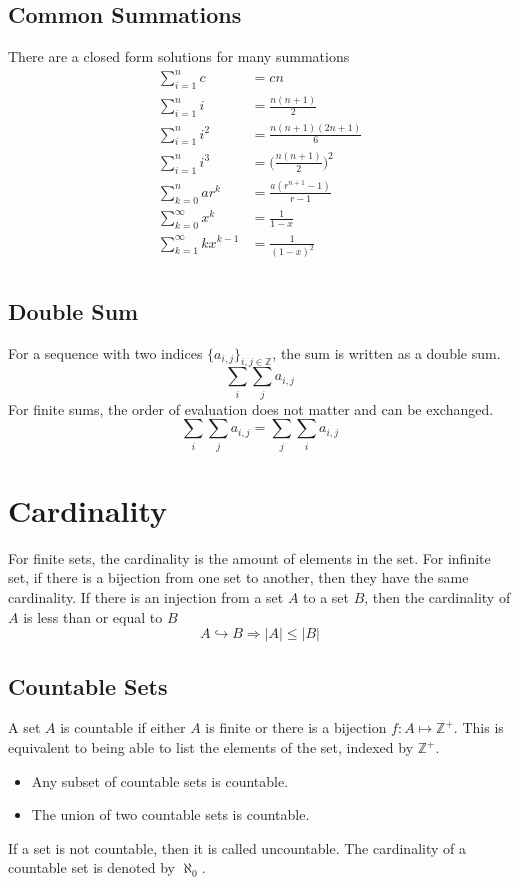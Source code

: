 \documentclass{article}
\theoremstyle{mytheoremstyle}
\theoremstyle{mytheoremstyle}
\theoremstyle{myproblemstyle}
\begin{document}
    \subsection*{Common Summations}
    There are a closed form solutions for many summations
    \begin{align*}
        \sum_{i=1}^{n} c &= cn \\
        \sum_{i=1}^{n} i &= \frac{n(n+1)}{2} \\
        \sum_{i=1}^{n} i^2 &= \frac{n(n+1)(2n+1)}{6} \\
        \sum_{i=1}^{n} i^3 &= \bigg(\frac{n(n+1)}{2}\bigg)^2 \\
        \sum_{k=0}^n ar^k &= \frac{a(r^{n+1} - 1)}{r - 1} \\
        \sum_{k=0}^\infty x^k &= \frac{1}{1-x} \\
        \sum_{k=1}^\infty kx^{k-1} &= \frac{1}{(1-x)^2} \\
    \end{align*}

    \subsection*{Double Sum}
    For a sequence with two indices $\{a_{i,j}\}_{i,j\in \mathbb{Z}}$, the sum
    is written as a double sum.
    \[
        \sum_i\sum_j a_{i,j}
    \]
    For finite sums, the order of evaluation does not matter and can be
    exchanged.
    \[
        \sum_i\sum_j a_{i,j} = \sum_j\sum_i a_{i,j}
    \]

    \section*{Cardinality}
    For finite sets, the cardinality is the amount of elements in the set. For
    infinite set, if there is a bijection from one set to another, then they
    have the same cardinality. If there is an injection from a set $A$ to a set
    $B$, then the cardinality of $A$ is less than or equal to $B$
    \[
        A \hookrightarrow B \Rightarrow |A| \le |B|
    \]

    \subsection*{Countable Sets}
    A set $A$ is countable if either $A$ is finite or there is a bijection
    $f: A \mapsto \mathbb{Z}^+$. This is equivalent to being able to list the
    elements of the set, indexed by $\mathbb{Z}^+$.
    \begin{itemize}
        \item Any subset of countable sets is countable.
        \item The union of two countable sets is countable.
    \end{itemize}
    If a set is not countable, then it is called uncountable. The cardinality of
    a countable set is denoted by $\aleph_0$.
\end{document}

